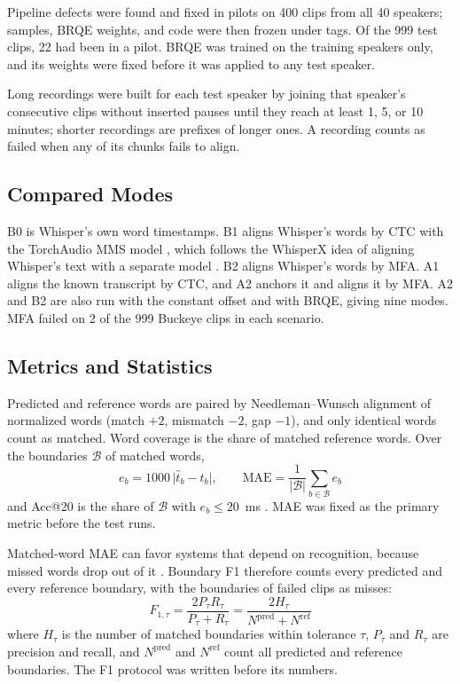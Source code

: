 \documentclass[conference,a4paper]{IEEEtran}
\begin{document}
Pipeline defects were found and fixed in pilots on 400 clips from all 40 speakers; samples, BRQE weights, and code were then frozen under tags. Of the 999 test clips, 22 had been in a pilot. BRQE was trained on the training speakers only, and its weights were fixed before it was applied to any test speaker.

Long recordings were built for each test speaker by joining that speaker's consecutive clips without inserted pauses until they reach at least 1, 5, or 10 minutes; shorter recordings are prefixes of longer ones. A recording counts as failed when any of its chunks fails to align.

\subsection{Compared Modes}
B0 is Whisper's own word timestamps. B1 aligns Whisper's words by CTC with the TorchAudio MMS model \cite{Pratap2024,Hwang2023}, which follows the WhisperX idea of aligning Whisper's text with a separate model \cite{Bain2023}. B2 aligns Whisper's words by MFA. A1 aligns the known transcript by CTC, and A2 anchors it and aligns it by MFA. A2 and B2 are also run with the constant offset and with BRQE, giving nine modes. MFA failed on 2 of the 999 Buckeye clips in each scenario.

\subsection{Metrics and Statistics}
Predicted and reference words are paired by Needleman--Wunsch alignment of normalized words (match $+2$, mismatch $-2$, gap $-1$), and only identical words count as matched. Word coverage is the share of matched reference words. Over the boundaries $\mathcal{B}$ of matched words,
\begin{equation}
e_b = 1000\,\lvert \hat{t}_b - t_b \rvert,\qquad
\mathrm{MAE} = \frac{1}{\lvert\mathcal{B}\rvert}\sum_{b\in\mathcal{B}} e_b
\label{eq:mae}
\end{equation}
and Acc@20 is the share of $\mathcal{B}$ with $e_b\le20$~ms \cite{Stolcke2014}. MAE was fixed as the primary metric before the test runs.

Matched-word MAE can favor systems that depend on recognition, because missed words drop out of it \cite{Chu2026FABench}. Boundary F1 therefore counts every predicted and every reference boundary, with the boundaries of failed clips as misses:
\begin{equation}
F_{1,\tau} = \frac{2P_\tau R_\tau}{P_\tau + R_\tau} = \frac{2H_\tau}{N^{\mathrm{pred}} + N^{\mathrm{ref}}}
\label{eq:f1}
\end{equation}
where $H_\tau$ is the number of matched boundaries within tolerance $\tau$, $P_\tau$ and $R_\tau$ are precision and recall, and $N^{\mathrm{pred}}$ and $N^{\mathrm{ref}}$ count all predicted and reference boundaries. The F1 protocol was written before its numbers.
\end{document}
